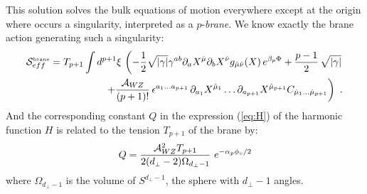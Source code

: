 \documentclass[a4paper,12pt]{article}
\def\action{{\cal S}}
\def\hmu{{\hat \mu}}
\def\hnu{{\hat \nu}}
\def\dperp{d_{\scriptscriptstyle\perp}}
\begin{document}
This solution solves the bulk equations of motion everywhere except at the origin
where occurs a singularity, interpreted as a $p$-{\it brane}.
We know exactly the brane action generating such a singularity:
%
\begin{eqnarray}
	\nonumber
\action_{eff}^{\mbox{\tiny brane}} = T_{p+1} \int d^{p+1} \xi\,
\left(
-\frac{1}{2}
\sqrt{|\gamma|}
\gamma^{ab}
\partial_a X^\hmu \partial_b X^\hnu
g_{\hmu\hnu} (X) \, e^{\beta_p \Phi}
+\frac{p-1}{2} \, \sqrt{|\gamma|}
\right. \\
	\label{eq:actionbraneunivers}
\left.
+\frac{{\cal A}_{WZ}}{(p+1)!}\, \epsilon^{a_1\ldots a_{p+1}}
\, \partial_{a_1} X^{\hmu_1} \ldots \partial_{a_{p+1}} X^{\hmu_{p+1}}
C_{\hmu_1\ldots \hmu_{p+1}}
\right)
\ .
\end{eqnarray}
%
And the corresponding constant $Q$ in the expression (\ref{eq:H}) of
the harmonic function $H$ is related to the tension $T_{p+1}$ of the brane
by:
%
\begin{equation}
Q =  \frac{{\cal A}_{WZ}^2 T_{p+1}}{2(\dperp-2)\Omega_{d_\perp-1}} \
e^{-\alpha_p \phi_\circ /2}
\end{equation}
%
where $\Omega_{\dperp-1}$ is the volume of $S^{\dperp-1}$, the sphere
with $\dperp-1$ angles.
\end{document}
